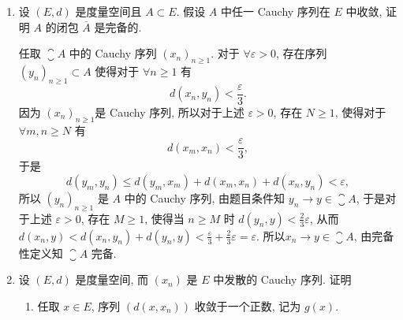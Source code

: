 \begin{enumerate}
  \item 设 $(E,d)$ 是度量空间且 $A\subset E$. 假设 $A$ 中任一 Cauchy 序列在 $E$ 中收敛,
  证明 $A$ 的闭包 $\overline{A}$ 是完备的.
    \begin{answer}
      任取 $\closure{A}$ 中的 Cauchy 序列 $(x_n)_{n\geq 1}$.
      对于 $\forall\varepsilon>0$, 存在序列 $(y_n)_{n\geq 1}\subset A$ 使得对于 $\forall n\geq 1$ 有
      \[d(x_n,y_n)<\frac{\varepsilon}{3}.\]
      因为 $(x_n)_{n\geq 1}$是 Cauchy 序列, 所以对于上述 $\varepsilon>0$,
      存在 $N\geq 1$, 使得对于 $\forall m,n\geq N$ 有
      \[d(x_m,x_n)<\frac{\varepsilon}{3},\]
      于是
      \[d(y_m,y_n)\leq d(y_m,x_m)+d(x_m,x_n)+d(x_n,y_n)<\varepsilon,\]
      所以 $(y_n)_{n\geq 1}$ 是 $A$ 中的 Cauchy 序列, 由题目条件知 $y_n\to y\in\closure{A}$,
      于是对于上述 $\varepsilon>0$, 存在 $M\geq 1$, 使得当 $n\geq M$ 时 $d(y_n,y)<\frac{2}{3}\varepsilon$,
      从而 $d(x_n,y)<d(x_n,y_n)+d(y_n,y)<\frac{\varepsilon}{3}+\frac{2}{3}\varepsilon=\varepsilon$.
      所以$x_n\to y\in\closure{A}$, 由完备性定义知 $\closure{A}$ 完备.
    \end{answer}
  \item 设 $(E,d)$ 是度量空间, 而 $(x_n)$ 是 $E$ 中发散的 Cauchy 序列. 证明
    \begin{enumerate}
        \item 任取 $x\in E$, 序列 $(d(x,x_n))$ 收敛于一个正数, 记为 $g(x)$.

\end{enumerate}
\end{enumerate}
